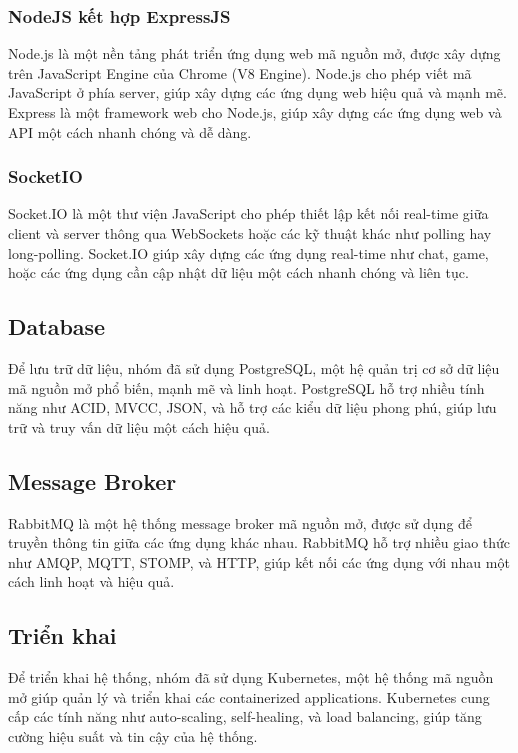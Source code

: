 \subsubsection{NodeJS kết hợp ExpressJS} 
\noindent Node.js là một nền tảng phát triển ứng dụng web mã nguồn mở, được xây dựng trên JavaScript Engine của Chrome (V8 Engine). Node.js cho phép viết mã JavaScript ở phía server, giúp xây dựng các ứng dụng web hiệu quả và mạnh mẽ. \\[0.5cm]
\noindent Express là một framework web cho Node.js, giúp xây dựng các ứng dụng web và API một cách nhanh chóng và dễ dàng.
\subsubsection{SocketIO}
\noindent Socket.IO là một thư viện JavaScript cho phép thiết lập kết nối real-time giữa client và server thông qua WebSockets hoặc các kỹ thuật khác như polling hay long-polling. Socket.IO giúp xây dựng các ứng dụng real-time như chat, game, hoặc các ứng dụng cần cập nhật dữ liệu một cách nhanh chóng và liên tục.

\subsection{Database}
\noindent Để lưu trữ dữ liệu, nhóm đã sử dụng PostgreSQL, một hệ quản trị cơ sở dữ liệu mã nguồn mở phổ biến, mạnh mẽ và linh hoạt. PostgreSQL hỗ trợ nhiều tính năng như ACID, MVCC, JSON, và hỗ trợ các kiểu dữ liệu phong phú, giúp lưu trữ và truy vấn dữ liệu một cách hiệu quả.

\subsection{Message Broker}
\noindent RabbitMQ là một hệ thống message broker mã nguồn mở, được sử dụng để truyền thông tin giữa các ứng dụng khác nhau. RabbitMQ hỗ trợ nhiều giao thức như AMQP, MQTT, STOMP, và HTTP, giúp kết nối các ứng dụng với nhau một cách linh hoạt và hiệu quả.

\subsection{Triển khai}
\noindent Để triển khai hệ thống, nhóm đã sử dụng Kubernetes, một hệ thống mã nguồn mở giúp quản lý và triển khai các containerized applications. Kubernetes cung cấp các tính năng như auto-scaling, self-healing, và load balancing, giúp tăng cường hiệu suất và tin cậy của hệ thống.
